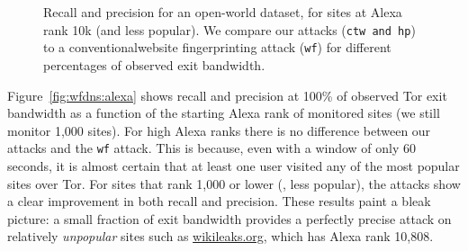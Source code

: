 \begin{figure}[t]
\centering
{}
\caption{Recall and precision for an open-world dataset, for sites
at Alexa rank 10k (and less popular). We compare our attacks (\texttt{ctw and
 \texttt{hp}}) to a conventionalwebsite fingerprinting attack (\texttt{wf}) for different
 percentages of observed exit bandwidth. }
\label{fig:wfdns:torpct}
\end{figure}


Figure~\ref{fig:wfdns:alexa} shows recall and precision at 100\% of
observed Tor exit bandwidth as a function of the starting Alexa rank of
monitored sites (we still monitor 1,000 sites).
For high Alexa ranks there is no difference between our attacks and the
\texttt{wf} attack. This is because, even with a window of only 60 seconds,
it is almost certain that at least one user visited any of the most popular
sites over Tor. For sites that rank 1,000 or lower (\ie, less popular),
the \name attacks show a clear improvement in both recall and precision.
These results paint a bleak picture: a small fraction of exit
bandwidth provides a perfectly precise attack on relatively
\emph{unpopular} sites such as \url{wikileaks.org}, which has Alexa rank
10,808.


